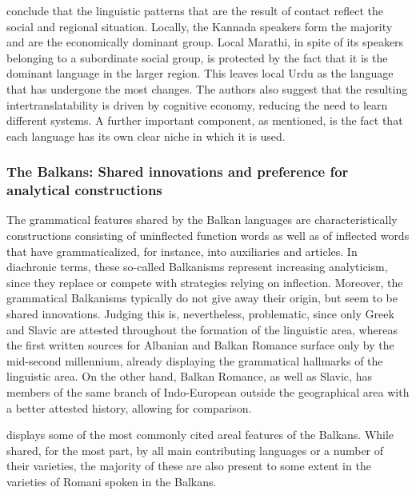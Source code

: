 \documentclass[output=paper]{langscibook}
\begin{document}
\textcite{gumperzetal1971convergence} conclude that the linguistic patterns that are the result of contact reflect the social and regional situation. Locally, the Kannada speakers form the majority and are the economically dominant group. Local Marathi, in spite of its speakers belonging to a subordinate social group, is protected by the fact that it is the dominant language in the larger region. This leaves local Urdu as the language that has undergone the most changes. The authors also suggest that the resulting intertranslatability is driven by cognitive economy, reducing the need to learn different systems. A further important component, as mentioned, is the fact that each language has its own clear niche in which it is used.

\subsubsection{The Balkans: Shared innovations and preference for analytical constructions}
\begin{sloppypar}
The grammatical features shared by the Balkan languages are characteristically constructions consisting of uninflected function words as well as of inflected words that have grammaticalized, for instance, into auxiliaries and articles. In diachronic terms, these so-called Balkanisms represent increasing analyticism, since they replace or compete with strategies relying on inflection. Moreover, the grammatical Balkanisms typically do not give away their origin, but seem to be shared innovations. Judging this is, nevertheless, problematic, since only Greek and Slavic are attested throughout the formation of the linguistic area, whereas the first written sources for Albanian and Balkan Romance surface only by the mid-second millennium, already displaying the grammatical hallmarks of the linguistic area. On the other hand, Balkan Romance, as well as Slavic, has members of the same branch of Indo-European outside the geographical area with a better attested history, allowing for comparison.
\end{sloppypar}

 displays some of the most commonly cited areal features of the Balkans. While shared, for the most part, by all main contributing languages or a number of their varieties, the majority of these are also present to some extent in the varieties of Romani spoken in the Balkans.
\end{document}
